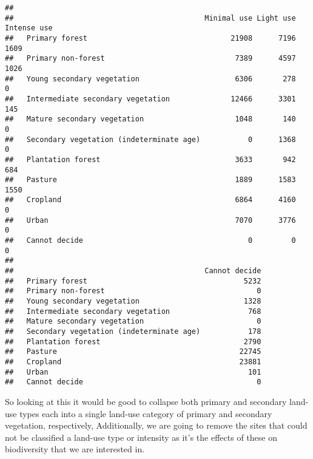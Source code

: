 \documentclass[
]{article}
\begin{document}
\begin{verbatim}
##                                           
##                                            Minimal use Light use Intense use
##   Primary forest                                 21908      7196        1609
##   Primary non-forest                              7389      4597        1026
##   Young secondary vegetation                      6306       278           0
##   Intermediate secondary vegetation              12466      3301         145
##   Mature secondary vegetation                     1048       140           0
##   Secondary vegetation (indeterminate age)           0      1368           0
##   Plantation forest                               3633       942         684
##   Pasture                                         1889      1583        1550
##   Cropland                                        6864      4160           0
##   Urban                                           7070      3776           0
##   Cannot decide                                      0         0           0
##                                           
##                                            Cannot decide
##   Primary forest                                    5232
##   Primary non-forest                                   0
##   Young secondary vegetation                        1328
##   Intermediate secondary vegetation                  768
##   Mature secondary vegetation                          0
##   Secondary vegetation (indeterminate age)           178
##   Plantation forest                                 2790
##   Pasture                                          22745
##   Cropland                                         23881
##   Urban                                              101
##   Cannot decide                                        0
\end{verbatim}

So looking at this it would be good to collapse both primary and
secondary land-use types each into a single land-use category of primary
and secondary vegetation, respectively, Additionally, we are going to
remove the sites that could not be classified a land-use type or
intensity as it's the effects of these on biodiversity that we are
interested in.
\end{document}
